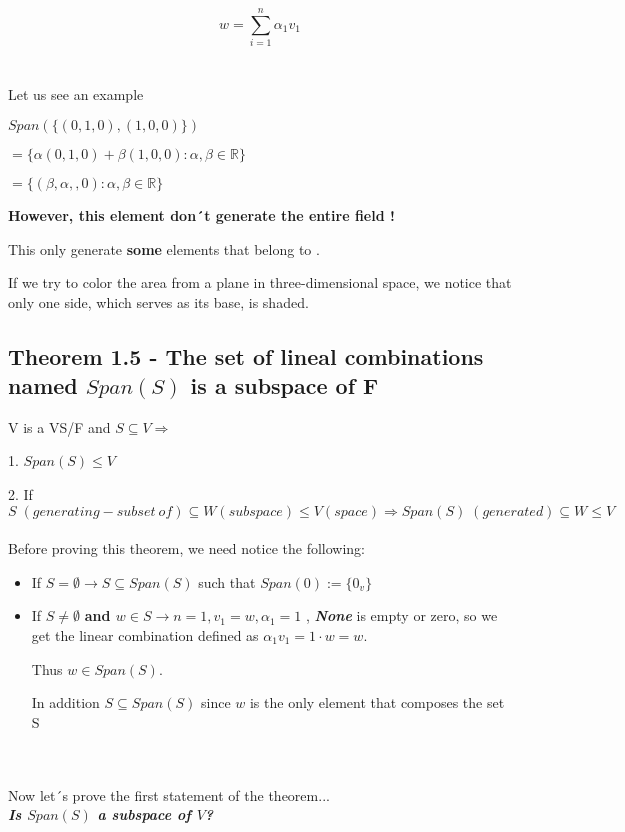\documentclass{article}
\begin{document}
\[
w = \sum_{i=1}^{n} \alpha_1 v_1
\]
\\
\\
Let us see an example

\(Span(\{(0,1,0),(1,0,0)\})\)

\(= \{\alpha(0,1,0) + \beta(1,0,0) : \alpha, \beta \in \mathbb{R}\}\)

\(= \{(\beta,\alpha,,0) : \alpha, \beta \in \mathbb{R} \}\)

\textbf{However, this element don´t generate the entire field !}

This only generate \textbf{some} elements that belong to .

If we try to color the area from a plane in three-dimensional space, we notice that only one side, which serves as its base, is shaded.

\subsection*{Theorem 1.5 - The set of lineal combinations named \(Span(S)\) is a subspace of F}

V is a VS/F and \(S \subseteq V \Rightarrow \)

1. \(Span(S) \leq V\) 

2. If \(S\;(generating-subset\:of) \subseteq W (subspace) \leq V (space) \Rightarrow Span(S)\; (generated) \subseteq W \leq V\)
\\
\\
Before proving this theorem, we need notice the following:

\begin{itemize}
    \item If \(S = \emptyset \rightarrow S \subseteq Span(S)\) such that \(Span(0) := \{0_v\}\)
    \item If \(S \neq \emptyset\) \textbf{and \(w \in S \rightarrow n=1, v_1=w, \alpha_1 = 1 \) }, \textbf{\textit{None}} is empty or zero, so we get the linear combination defined as \( \alpha_1 v_1 = 1\cdot w = w \). 
    
    Thus \(w \in Span(S)\).
    
    In addition \(S \subseteq Span(S)\) since \(w\) is the only element that composes the set S
\end{itemize}
\\
\\
Now let´s prove the first statement of the theorem...
\\

\textbf{\textit{Is \(Span(S)\) a subspace of \(V\)?}}
\end{document}

